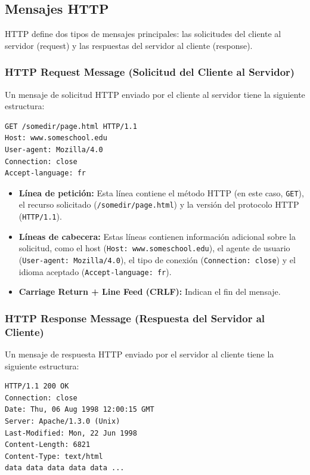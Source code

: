 \documentclass[a4paper,12pt]{article}
\begin{document}
\subsection{Mensajes HTTP}

HTTP define dos tipos de mensajes principales: las solicitudes del cliente al servidor (request) y las respuestas del servidor al cliente (response).

\subsubsection{HTTP Request Message (Solicitud del Cliente al Servidor)}

Un mensaje de solicitud HTTP enviado por el cliente al servidor tiene la siguiente estructura:

\begin{verbatim}
GET /somedir/page.html HTTP/1.1
Host: www.someschool.edu
User-agent: Mozilla/4.0
Connection: close
Accept-language: fr
\end{verbatim}

\begin{itemize}
    \item \textbf{Línea de petición:} Esta línea contiene el método HTTP (en este caso, \texttt{GET}), el recurso solicitado (\texttt{/somedir/page.html}) y la versión del protocolo HTTP (\texttt{HTTP/1.1}).
    \item \textbf{Líneas de cabecera:} Estas líneas contienen información adicional sobre la solicitud, como el host (\texttt{Host: www.someschool.edu}), el agente de usuario (\texttt{User-agent: Mozilla/4.0}), el tipo de conexión (\texttt{Connection: close}) y el idioma aceptado (\texttt{Accept-language: fr}).
    \item \textbf{Carriage Return + Line Feed (CRLF):} Indican el fin del mensaje.
\end{itemize}

\subsubsection{HTTP Response Message (Respuesta del Servidor al Cliente)}

Un mensaje de respuesta HTTP enviado por el servidor al cliente tiene la siguiente estructura:

\begin{verbatim}
HTTP/1.1 200 OK
Connection: close
Date: Thu, 06 Aug 1998 12:00:15 GMT
Server: Apache/1.3.0 (Unix)
Last-Modified: Mon, 22 Jun 1998
Content-Length: 6821
Content-Type: text/html
data data data data data ...
\end{verbatim}
\end{document}
